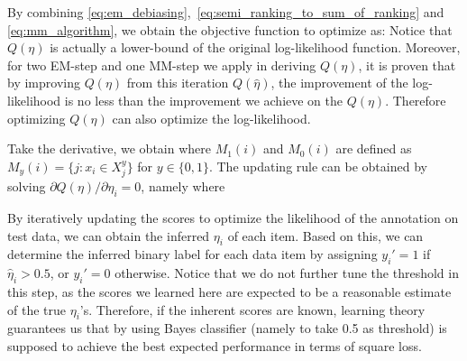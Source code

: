 By combining \eqref{eq:em_debiasing},~\eqref{eq:semi_ranking_to_sum_of_ranking} and \eqref{eq:mm_algorithm},
we obtain the objective function to optimize as:
%
Notice that $Q(\eta)$ is actually a lower-bound of the original log-likelihood function.
Moreover, for two EM-step and one MM-step we apply in deriving $Q(\eta)$,
it is proven that by improving $Q(\eta)$ from this iteration $Q(\hat{\eta})$, 
the improvement of the log-likelihood is no less than the improvement we achieve on the $Q(\eta)$.  
Therefore optimizing $Q(\eta)$ can also optimize the log-likelihood.



Take the derivative, we obtain
%
where $M_1(i)$ and $M_0(i)$ are defined as $M_y(i) = \{j:x_i \in X_j^y\}$ for $y \in \{0, 1\}$.
The updating rule can be obtained by solving $\partial Q(\eta) / \partial \eta_i = 0$, namely
where

By iteratively updating the scores to optimize the likelihood of the annotation on test data,
we can obtain the inferred $\eta_i$ of each item.
Based on this, we can determine the inferred binary label for each data item by assigning $y_i'=1$ if $\hat{\eta}_i > 0.5$,
or $y_i'=0$ otherwise.
Notice that we do not further tune the threshold in this step,
as the scores we learned here are expected to be a reasonable estimate of the true $\eta_i$'s.
Therefore, if the inherent scores are known,
learning theory guarantees us that by using Bayes classifier (namely to take 0.5 as threshold)
is supposed to achieve the best expected performance in terms of square loss. %


